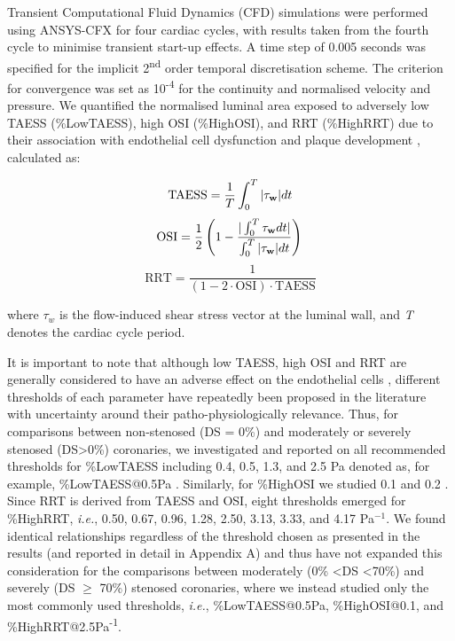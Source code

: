 \documentclass[preprint,11pt,review]{elsarticle}
\begin{document}
Transient Computational Fluid Dynamics (CFD) simulations were performed using ANSYS-CFX for four cardiac cycles, with results taken from the fourth cycle to minimise transient start-up effects. A time step of 0.005 seconds was specified for the implicit 2\textsuperscript{nd} order temporal discretisation scheme. The criterion for convergence was set as 10\textsuperscript{-4} for the continuity and normalised velocity and pressure. We quantified the normalised luminal area exposed to adversely low TAESS (\%LowTAESS), high OSI (\%HighOSI), and RRT (\%HighRRT) due to their association with endothelial cell dysfunction and plaque development \cite{Peiffer2013Does}, calculated as:

\begin{equation}
    \text{TAESS} = \frac 1 T \int_0^T|\mathbf{\tau_w}|dt \\
\end{equation}
\begin{equation}
    \text{OSI} = \frac 1 2 \left(1- \frac{|\int_0^T \mathbf{\tau_w} dt|}{\int_0^T |\mathbf{\tau_w}| dt}\right)\\
\end{equation}
\begin{equation}
    \text{RRT} = \frac{1}{(1-2\cdot\text{OSI})\cdot\text{TAESS}}
\end{equation}

where $\tau_{w}$ is the flow-induced shear stress vector at the luminal wall, and \textit{T} denotes the cardiac cycle period. 

It is important to note that although low TAESS, high OSI and RRT are generally considered to have an adverse effect on the endothelial cells \cite{peiffer_does_2013}, different thresholds of each parameter have repeatedly been proposed in the literature with uncertainty around their patho-physiologically relevance. Thus, for comparisons between non-stenosed (DS = 0\%) and moderately or severely stenosed (DS\textgreater0\%) coronaries, we investigated and reported on all recommended thresholds for \%LowTAESS including 0.4, 0.5, 1.3, and 2.5 Pa denoted as, for example,  \%LowTAESS@0.5Pa \cite{Hartman2021definition,Chiastra2017Healthy, Xie2014Computation, Stone2018Role}. Similarly,  for \%HighOSI we studied 0.1 and 0.2 \cite{Chiastra2017Healthy,Xie2014Computation}. Since RRT is derived from TAESS and OSI, eight thresholds emerged for \%HighRRT, \textit{i.e.}, 0.50, 0.67, 0.96, 1.28, 2.50, 3.13, 3.33, and 4.17 Pa$^{-1}$. We found identical relationships regardless of the threshold chosen as presented in the results (and reported in detail in Appendix A) and thus have not expanded this consideration for the comparisons between moderately (0\% \textless DS \textless 70\%) and severely (DS $\geq$ 70\%) stenosed coronaries, where we instead studied only the most commonly used thresholds, \textit{i.e.}, \%LowTAESS@0.5Pa, \%HighOSI@0.1, and \%HighRRT@2.5Pa\textsuperscript{-1}. 
\end{document}
